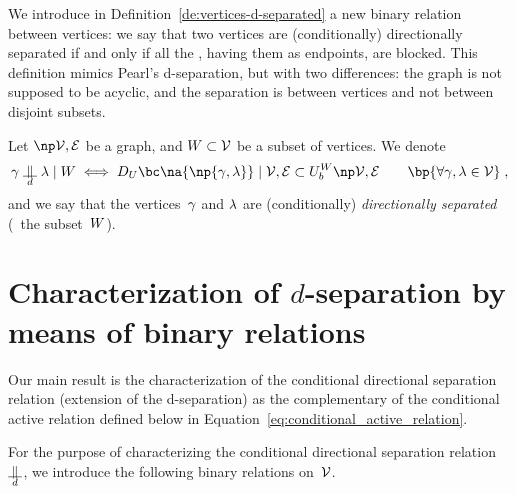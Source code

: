 \documentclass[12pt]{article}
\begin{document}
{{We introduce in Definition~\ref{de:vertices-d-separated} a new binary relation
between vertices: we say that 
two vertices are (conditionally) directionally separated if and only if
all the \undirectedEdgePaths, having them as endpoints, are blocked.
This definition mimics Pearl's d-separation, but with two differences:
the graph is not supposed to be acyclic, and the separation is between vertices
and not between disjoint subsets. 

  \begin{definition}
    \label{de:vertices-d-separated}
    Let \( \npOrientedGraph \) be a graph, 
    and $W\subset{\cal V}$ be a subset of vertices.
    We denote
    \begin{equation}
      \bgent \ConditionalDirectionalSeparation \cgent \mid \AgentSubsetW
      \iff 
      \bcDeploymentInUPaths{\na{\np{\bgent,\cgent}}}{\graph} \subset
      \BlockedUndirectedPaths{\graph}
      \qquad \bp{ \forall \bgent,\cgent \in \AGENT }
      \eqfinv
      \label{eq:vertices-d-separated}
    \end{equation}
    and we say that the vertices~$\gamma$ and $\lambda$ are 
    (conditionally) \emph{directionally separated}  (\wrt\ the subset~$W$).
  \end{definition}




\section{Characterization  of $d$-separation by means of binary relations}
\label{Characterization__of_the_conditional_directional_separation_binary_relation}

Our main result is the characterization of the conditional directional
separation relation (extension of the d-separation)
as the complementary of the conditional active relation defined below in
Equation~\eqref{eq:conditional_active_relation}.

For the purpose of characterizing the conditional directional separation relation~\(
\ConditionalDirectionalSeparation \), we introduce the following binary relations on~${\cal V}$.

}}
\end{document}
